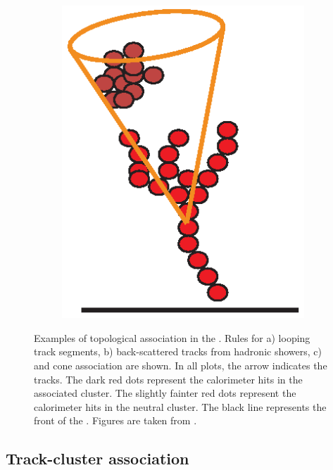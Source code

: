 \begin{figure}[tbph]
\begin{subfigure}[b]{0.3\textwidth}
    \caption{}
    \label{fig:pandoraTopoAssoBackScattered}
  \end{subfigure}
  \begin{subfigure}[b]{0.3\textwidth}
    \includegraphics[width=\textwidth]{pandora/coneAsso}
    \caption{}
    \label{fig:pandoraTopoAssoConeAsso}
  \end{subfigure}
\caption[Topological association in the \pandora.]
{Examples of topological association in the \pandora. Rules for a) looping track segments, b) back-scattered tracks from hadronic showers, c) and cone association are shown.  In all plots, the arrow indicates the tracks. The dark red dots represent the calorimeter hits in the associated cluster. The slightly fainter red dots represent the calorimeter hits in the neutral cluster. The black line represents the front of the \ECAL. Figures are taken from \cite{Marshall:pandoraLC}.}
\label{fig:pandoraTopoAsso}
\end{figure}

\subsection{Track-cluster association}

